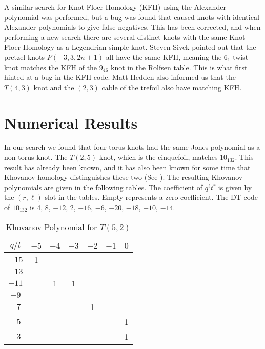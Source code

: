 \documentclass{article}
\theoremstyle{plain}
\begin{document}
        A similar search for Knot Floer Homology (KFH) using the Alexander polynomial
        was performed, but a bug was found that caused knots with identical
        Alexander polynomials to give false negatives. This has been corrected,
        and when performing a new search there are several distinct knots
        with the same Knot Floer Homology as a Legendrian simple knot. Steven
        Sivek pointed
        out that the pretzel knots $P(-3,3,2n+1)$ all have the same KFH, meaning
        the $6_{1}$ twist knot matches the KFH of the $9_{46}$ knot in the
        Rolfsen table. This is what first hinted at a bug in the KFH code.
        Matt Hedden also informed us that the $T(4,3)$ knot and the
        $(2,3)$ cable of the trefoil also have matching KFH.
    \section{Numerical Results}
        In our search we found that four torus knots had the same Jones
        polynomial as a non-torus knot. The $T(2,5)$ knot, which is the
        cinquefoil, matches $10_{132}$. This result has already been known,
        and it has also been known for some time that Khovanov homology
        distinguishes these two (See \cite{KatlasKhoHo}). The resulting
        Khovanov polynomials are given in the following tables. The coefficient
        of $q^{\ell}t^{r}$ is given by the $(r,\ell)$ slot in the tables. Empty
        represents a zero coefficient. The DT code of $10_{132}$ is
        4, 8, $-12$, 2, $-16$, $-6$, $-20$, $-18$, $-10$, $-14$.
        \begin{table}[H]
            \centering
            \begin{tabular}{| c | c | c | c | c | c | c |}
                \hline
                $q/t$&$-5$&$-4$&$-3$&$-2$&$-1$&$0$\\
                \hline
                $-15$&1&&&&&\\
                \hline
                $-13$&&&&&&\\
                \hline
                $-11$&&1&1&&&\\
                \hline
                $-9$&&&&&&\\
                \hline
                $-7$&&&&1&&\\
                \hline
                $-5$&&&&&&1\\
                \hline
                $-3$&&&&&&1\\
                \hline
            \end{tabular}
            \caption{Khovanov Polynomial for $T(5,2)$}
        \end{table}
\end{document}
